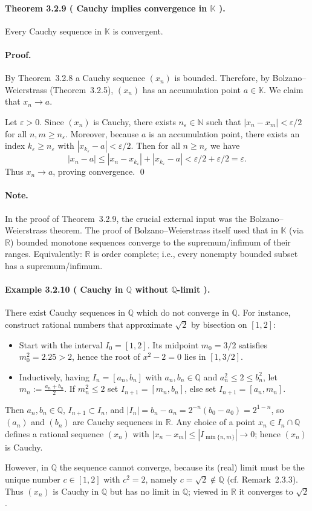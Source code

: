 \documentclass[12pt,a4paper]{article}
\newcommand{\N}{\mathbb{N}}
\newcommand{\Q}{\mathbb{Q}}
\newcommand{\R}{\mathbb{R}}
\newcommand{\K}{\mathbb{K}} %
\newcommand{\eps}{\varepsilon}
\newcommand{\NumberedTheorem}[3]{%
\paragraph*{Theorem #1 ( #2 ).} #3\par}
\newcommand{\NumberedExample}[3]{%
\paragraph*{Example #1 ( #2 ).} #3\par}
\theoremstyle{plain}
\theoremstyle{definition}
\theoremstyle{remark}
\begin{document}
\NumberedTheorem{3.2.9}{Cauchy implies convergence in $\K$}{Every Cauchy sequence in $\K$ is convergent.}

\paragraph{Proof.} By Theorem~3.2.8 a Cauchy sequence $(x_n)$ is bounded. Therefore, by Bolzano--Weierstrass (Theorem~3.2.5), $(x_n)$ has an accumulation point $a\in\K$. We claim that $x_n\to a$.

Let $\eps>0$. Since $(x_n)$ is Cauchy, there exists $n_\eps\in\N$ such that $|x_n-x_m|<\eps/2$ for all $n,m\ge n_\eps$. Moreover, because $a$ is an accumulation point, there exists an index $k_\eps\ge n_\eps$ with $|x_{k_\eps}-a|<\eps/2$. Then for all $n\ge n_\eps$ we have
\[
	|x_n-a| \le |x_n-x_{k_\eps}| + |x_{k_\eps}-a| < \eps/2 + \eps/2 = \eps.
\]
Thus $x_n\to a$, proving convergence. \qed

\paragraph{Note.} In the proof of Theorem~3.2.9, the crucial external input was the Bolzano--Weierstrass theorem. The proof of Bolzano--Weierstrass itself used that in $\K$ (via $\R$) bounded monotone sequences converge to the supremum/infimum of their ranges. Equivalently: $\R$ is order complete; i.e., every nonempty bounded subset has a supremum/infimum.

\NumberedExample{3.2.10}{Cauchy in $\Q$ without $\Q$-limit}{There exist Cauchy sequences in $\Q$ which do not converge in $\Q$. For instance, construct rational numbers that approximate $\sqrt{2}$ by bisection on $[1,2]$:
\begin{itemize}[leftmargin=*]
	\item Start with the interval $I_0=[1,2]$. Its midpoint $m_0=3/2$ satisfies $m_0^2=2.25>2$, hence the root of $x^2-2=0$ lies in $[1,3/2]$.
	\item Inductively, having $I_n=[a_n,b_n]$ with $a_n,b_n\in\Q$ and $a_n^2\le 2\le b_n^2$, let $m_n:=\tfrac{a_n+b_n}{2}$. If $m_n^2\le 2$ set $I_{n+1}=[m_n,b_n]$, else set $I_{n+1}=[a_n,m_n]$.
\end{itemize}
Then $a_n,b_n\in\Q$, $I_{n+1}\subset I_n$, and $|I_n|=b_n-a_n=2^{-n}(b_0-a_0)=2^{1-n}$, so $(a_n)$ and $(b_n)$ are Cauchy sequences in $\R$. Any choice of a point $x_n\in I_n\cap\Q$ defines a rational sequence $(x_n)$ with $|x_n-x_m|\le |I_{\min\{n,m\}}|\to 0$; hence $(x_n)$ is Cauchy.

However, in $\Q$ the sequence cannot converge, because its (real) limit must be the unique number $c\in[1,2]$ with $c^2=2$, namely $c=\sqrt{2}\notin\Q$ (cf. Remark~2.3.3). Thus $(x_n)$ is Cauchy in $\Q$ but has no limit in $\Q$; viewed in $\R$ it converges to $\sqrt{2}$.}
\end{document}
